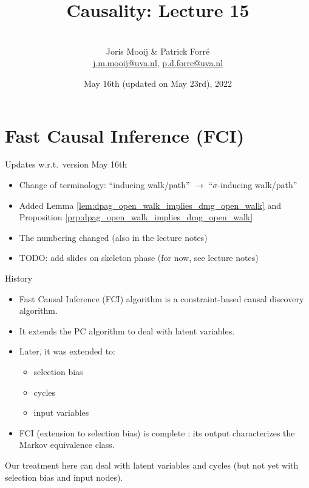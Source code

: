 \title[Causality]{Causality: Lecture 15}
\author[Joris Mooij]{\\[5mm]\large Joris Mooij \& Patrick Forr\'e\\
\url{j.m.mooij@uva.nl}, \url{p.d.forre@uva.nl}}
\date[2022-05-16]{\normalsize May 16th (updated on May 23rd), 2022}
\maketitle

\part{Fast Causal Inference (FCI)}
\frame{\partpage}

\begin{frame}{Updates w.r.t.\ version May 16th}
  \begin{itemize}
    \item Change of terminology: ``inducing walk/path'' $\to$ ``$\sigma$-inducing walk/path''
    \item Added Lemma \ref{lem:dpag_open_walk_implies_dmg_open_walk} and Proposition \ref{prp:dpag_open_walk_implies_dmg_open_walk}
    \item The numbering changed (also in the lecture notes)
    \item \alert{TODO: add slides on skeleton phase (for now, see lecture notes)}
  \end{itemize}
\end{frame}

\begin{frame}{History}
  \begin{itemize}
    \item Fast Causal Inference (FCI) algorithm \cite{SMR1995} is a constraint-based causal discovery algorithm.
    \item It extends the PC algorithm \cite{SGS2000} to deal with latent variables.
    \item Later, it was extended to:
      \begin{itemize}
        \item selection bias \cite{SMR1999}
        \item cycles \cite{MooijClaassen_UAI_20}
        \item input variables \cite{Mooij++_JMLR_20}
      \end{itemize}
    \item FCI (extension to selection bias) is complete \cite{Zhang2008_AI}: its output characterizes the Markov equivalence class.
  \end{itemize}
  Our treatment here can deal with latent variables and cycles (but not yet with selection bias and input nodes).
\end{frame}

